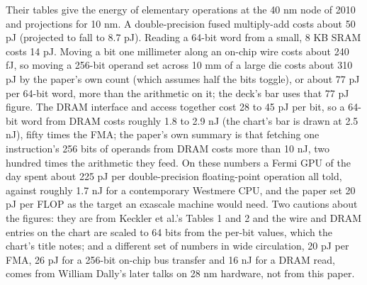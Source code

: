 \documentclass[11pt,letterpaper]{article}
\begin{document}
Their tables give the energy of elementary operations at the 40 nm node of 2010 and projections for 10 nm. A double-precision fused multiply-add costs about 50 pJ (projected to fall to 8.7 pJ). Reading a 64-bit word from a small, 8 KB SRAM costs 14 pJ. Moving a bit one millimeter along an on-chip wire costs about 240 fJ, so moving a 256-bit operand set across 10 mm of a large die costs about 310 pJ by the paper's own count (which assumes half the bits toggle), or about 77 pJ per 64-bit word, more than the arithmetic on it; the deck's bar uses that 77 pJ figure. The DRAM interface and access together cost 28 to 45 pJ per bit, so a 64-bit word from DRAM costs roughly 1.8 to 2.9 nJ (the chart's bar is drawn at 2.5 nJ), fifty times the FMA; the paper's own summary is that fetching one instruction's 256 bits of operands from DRAM costs more than 10 nJ, two hundred times the arithmetic they feed. On these numbers a Fermi GPU of the day spent about 225 pJ per double-precision floating-point operation all told, against roughly 1.7 nJ for a contemporary Westmere CPU, and the paper set 20 pJ per FLOP as the target an exascale machine would need. Two cautions about the figures: they are from Keckler et al.'s Tables 1 and 2 and the wire and DRAM entries on the chart are scaled to 64 bits from the per-bit values, which the chart's title notes; and a different set of numbers in wide circulation, 20 pJ per FMA, 26 pJ for a 256-bit on-chip bus transfer and 16 nJ for a DRAM read, comes from William Dally's later talks on 28 nm hardware, not from this paper.
\end{document}
